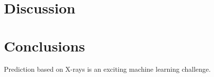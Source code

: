 \documentclass[10pt,twocolumn,letterpaper]{article}
\begin{document}
\section{Discussion}


\section{Conclusions}
Prediction based on X-rays is an exciting machine learning challenge.

\printbibliography
\end{document}
